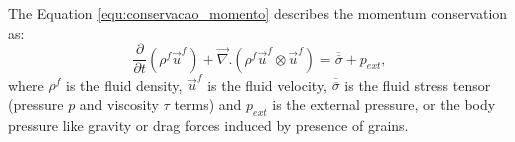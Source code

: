     The Equation \ref{equ:conservacao_momento} describes the momentum conservation as:
\begin{equation}
    \frac{\partial}{\partial t}\left(\rho^{f}\vec{u}^{f}\right) +\vec{\nabla}.\left(\rho^{f}\vec{u}^{f}\otimes\vec{u}^{f}\right) = \overline{\overline{\sigma}} +p_{ext},
    \label{equ:conservacao_momento}
\end{equation}
where $\rho^{f}$ is the fluid density, $\vec{u}^{f}$ is the fluid velocity, $\overline{\overline{\sigma}}$ is the fluid stress tensor (pressure $p$ and viscosity $\tau$ terms) and $p_{ext}$ is the external pressure, or the body pressure like gravity or drag forces induced by presence of grains.

